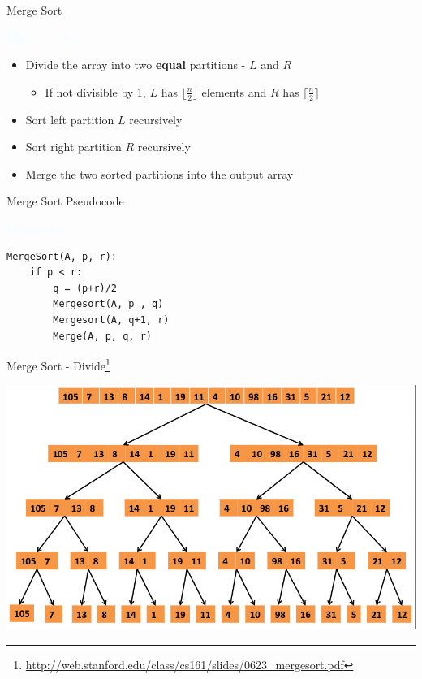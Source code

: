 \documentclass{beamer}
\newcommand{\tblue}[1]{{\Large {\textcolor{azure}{#1}}}}
\begin{document}
\begin{frame}{Merge Sort}

\tblue{High Level Idea :}
\begin{itemize}
\item Divide the array into two {\bf equal} partitions - $L$ and $R$ 
\begin{itemize}
    \item If not divisible by 1, $L$ has $\lfloor \frac{n}{2} \rfloor$ elements and $R$ has $\lceil \frac{n}{2} \rceil$
\end{itemize}
\item Sort left partition $L$ recursively
\item Sort right partition $R$ recursively
\item Merge the two sorted partitions into the output array
\end{itemize}
\end{frame}


\begin{frame}[fragile]{Merge Sort Pseudocode}

\tblue{Pseudocode:}
\begin{verbatim}
MergeSort(A, p, r):
    if p < r:
        q = (p+r)/2
        Mergesort(A, p , q)
        Mergesort(A, q+1, r)
        Merge(A, p, q, r)
\end{verbatim}
\end{frame}


\begin{frame}{Merge Sort - Divide\footnote{\url{http://web.stanford.edu/class/cs161/slides/0623_mergesort.pdf}}}
\begin{center}
    \includegraphics[scale=0.38]{mergeSortRecursion.png}
\end{center}
\end{frame}
\end{document}
